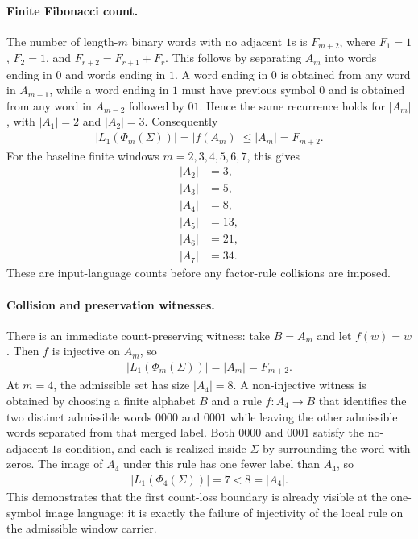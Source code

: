 \paragraph{Finite Fibonacci count.}
The number of length-$m$ binary words with no adjacent $1$s is $F_{m+2}$, where $F_1=1$, $F_2=1$, and $F_{r+2}=F_{r+1}+F_r$. This follows by separating $A_m$ into words ending in $0$ and words ending in $1$. A word ending in $0$ is obtained from any word in $A_{m-1}$, while a word ending in $1$ must have previous symbol $0$ and is obtained from any word in $A_{m-2}$ followed by $01$. Hence the same recurrence holds for $|A_m|$, with $|A_1|=2$ and $|A_2|=3$. Consequently
$$
\begin{aligned}
|L_1(\Phi_m(\Sigma))| = |f(A_m)| \leq |A_m| = F_{m+2}.
\end{aligned}
$$
For the baseline finite windows $m=2,3,4,5,6,7$, this gives
$$
\begin{aligned}
|A_2| &= 3,\\
|A_3| &= 5,\\
|A_4| &= 8,\\
|A_5| &= 13,\\
|A_6| &= 21,\\
|A_7| &= 34.
\end{aligned}
$$
These are input-language counts before any factor-rule collisions are imposed.

\paragraph{Collision and preservation witnesses.}
There is an immediate count-preserving witness: take $B=A_m$ and let $f(w)=w$. Then $f$ is injective on $A_m$, so
$$
\begin{aligned}
|L_1(\Phi_m(\Sigma))|=|A_m|=F_{m+2}.
\end{aligned}
$$
At $m=4$, the admissible set has size $|A_4|=8$. A non-injective witness is obtained by choosing a finite alphabet $B$ and a rule $f:A_4\to B$ that identifies the two distinct admissible words $0000$ and $0001$ while leaving the other admissible words separated from that merged label. Both $0000$ and $0001$ satisfy the no-adjacent-$1$s condition, and each is realized inside $\Sigma$ by surrounding the word with zeros. The image of $A_4$ under this rule has one fewer label than $A_4$, so
$$
\begin{aligned}
|L_1(\Phi_4(\Sigma))|=7<8=|A_4|.
\end{aligned}
$$
This demonstrates that the first count-loss boundary is already visible at the one-symbol image language: it is exactly the failure of injectivity of the local rule on the admissible window carrier.

